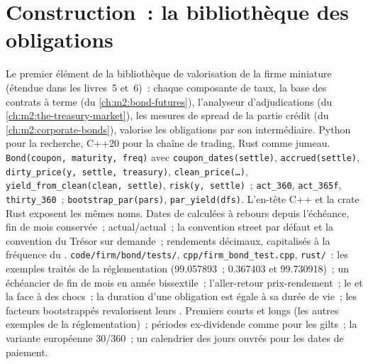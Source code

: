 \section{Construction~: la bibliothèque des obligations}\label{bld:m2:government-bonds:bond}

\begin{build}
 Le premier élément de la bibliothèque de valorisation de la firme miniature
(étendue dans les livres~5 et~6)~: chaque composante de taux, la base des contrats à terme
(du \cref{ch:m2:bond-futures}), l'analyseur d'adjudications
(du \cref{ch:m2:the-treasury-market}), les mesures de spread de la partie crédit
(du \cref{ch:m2:corporate-bonds}), valorise les obligations par son intermédiaire. Python pour la recherche,
C++20 pour la chaîne de trading, Rust comme jumeau.
 \texttt{Bond(coupon, maturity, freq)} avec
\texttt{coupon\_dates(settle)}, \texttt{accrued(settle)},
\texttt{dirty\_price(y, settle, treasury)}, \texttt{clean\_price(\ldots)},
\texttt{yield\_from\_clean(clean, settle)}, \texttt{risk(y, settle)}~;
\texttt{act\_360}, \texttt{act\_365f}, \texttt{thirty\_360}~;
\texttt{bootstrap\_par(pars)}, \texttt{par\_yield(dfs)}. L'en-tête C++ et la
crate Rust exposent les mêmes noms.
 Dates de  calculées à rebours depuis l'échéance, fin de mois conservée~;
 actual/actual~; la convention street par défaut et la
convention du Trésor sur demande~; rendements décimaux, capitalisés à
la fréquence du .
 \texttt{code/firm/bond/tests/},
\texttt{cpp/firm\_bond\_test.cpp}, \texttt{rust/}~: les exemples traités de la
réglementation (99.057893~;  0.367403 et 99.730918)~; un échéancier de
fin de mois en année bissextile~; l'aller-retour prix-rendement~; le  et la
 face à des chocs~; la duration d'une obligation  est égale à sa durée de vie~; les facteurs
bootstrappés revalorisent leurs .
 Premiers  courts et longs (les autres
exemples de la réglementation)~; périodes ex-dividende comme pour les gilts~; la variante européenne 30/360~; un
calendrier des jours ouvrés pour les dates de paiement.
\end{build}

